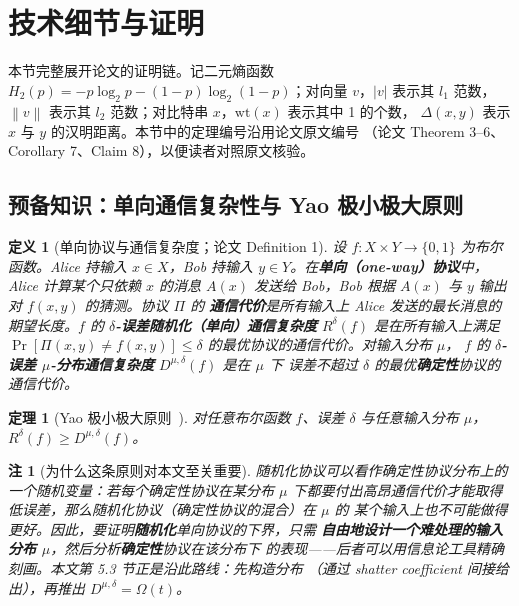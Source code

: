 \documentclass[UTF8, 11pt, a4paper, linestretch=1.15]{ctexart}
\theoremstyle{zhstyle}
\newtheorem{theorem}{定理}
\newtheorem{definition}{定义}
\newtheorem{remark}{注}
\newcommand{\norm}[1]{\left\lVert #1 \right\rVert}
\begin{document}
	\section{技术细节与证明}
	
	本节完整展开论文的证明链。记二元熵函数
	$H_2(p) = -p\log_2 p - (1-p)\log_2(1-p)$；对向量 $v$，$|v|$ 表示其 $l_1$ 范数，
	$\norm{v}$ 表示其 $l_2$ 范数；对比特串 $x$，$\mathrm{wt}(x)$ 表示其中 1 的个数，
	$\Delta(x, y)$ 表示 $x$ 与 $y$ 的汉明距离。本节中的定理编号沿用论文原文编号
	（论文 Theorem 3--6、Corollary 7、Claim 8），以便读者对照原文核验。
	
	\subsection{预备知识：单向通信复杂性与 Yao 极小极大原则}
	
	\begin{definition}[单向协议与通信复杂度；论文 Definition 1]
		设 $f: X \times Y \to \{0, 1\}$ 为布尔函数。Alice 持输入 $x \in X$，Bob 持输入
		$y \in Y$。在\textbf{单向（one-way）协议}中，Alice 计算某个只依赖 $x$ 的消息
		$A(x)$ 发送给 Bob，Bob 根据 $A(x)$ 与 $y$ 输出对 $f(x, y)$ 的猜测。协议 $\Pi$ 的
		\textbf{通信代价}是所有输入上 Alice 发送的最长消息的期望长度。$f$ 的
		\textbf{$\delta$-误差随机化（单向）通信复杂度} $R^{\delta}(f)$ 是在所有输入上满足
		$\Pr[\Pi(x,y) \neq f(x,y)] \leq \delta$ 的最优协议的通信代价。对输入分布 $\mu$，
		$f$ 的 \textbf{$\delta$-误差 $\mu$-分布通信复杂度} $D^{\mu,\delta}(f)$ 是在 $\mu$ 下
		误差不超过 $\delta$ 的最优\textbf{确定性}协议的通信代价。
	\end{definition}
	
	\begin{theorem}[Yao 极小极大原则~\cite{Yao77}]
		对任意布尔函数 $f$、误差 $\delta$ 与任意输入分布 $\mu$，
		$R^{\delta}(f) \geq D^{\mu,\delta}(f)$。
	\end{theorem}
	
	\begin{remark}[为什么这条原则对本文至关重要]
		随机化协议可以看作确定性协议分布上的一个随机变量：若每个确定性协议在某分布 $\mu$
		下都要付出高昂通信代价才能取得低误差，那么随机化协议（确定性协议的混合）在 $\mu$ 的
		某个输入上也不可能做得更好。因此，要证明\textbf{随机化}单向协议的下界，只需
		\textbf{自由地设计一个难处理的输入分布 $\mu$}，然后分析\textbf{确定性}协议在该分布下
		的表现——后者可以用信息论工具精确刻画。本文第 5.3 节正是沿此路线：先构造分布
		（通过 shatter coefficient 间接给出），再推出 $D^{\mu,\delta} = \Omega(t)$。
	\end{remark}
	
\end{document}
